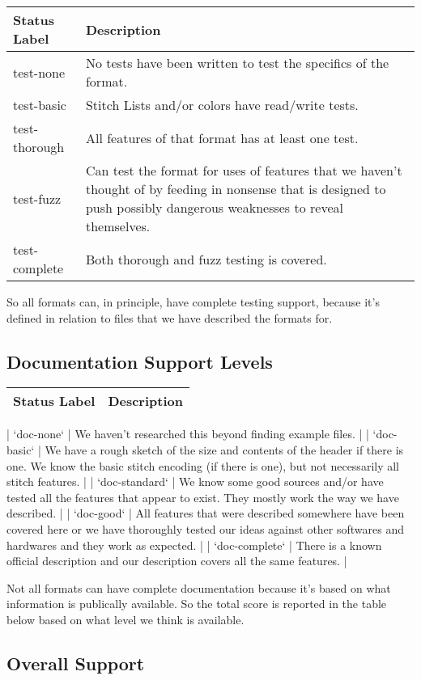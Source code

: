 \begin{longtable}{l p{8cm}}
Status Label & Description \\
\hline
test-none & No tests have been written to test the specifics of the format. \\
test-basic & Stitch Lists and/or colors have read/write tests. \\
test-thorough & All features of that format has at least one test. \\
test-fuzz & Can test the format for uses of features that we haven't thought of by feeding in nonsense that is designed to push possibly dangerous weaknesses to reveal themselves. \\
test-complete & Both thorough and fuzz testing is covered.
\end{longtable}

So all formats can, in principle, have complete testing support, because it's defined in relation to files that we have described the formats for.

\subsection{Documentation Support Levels}

\begin{longtable}{l p{8cm}}
Status Label & Description \\
\hline
\end{longtable}

| `doc-none` | We haven't researched this beyond finding example files. |
| `doc-basic` | We have a rough sketch of the size and contents of the header if there is one. We know the basic stitch encoding (if there is one), but not necessarily all stitch features. |
| `doc-standard` | We know some good sources and/or have tested all the features that appear to exist. They mostly work the way we have described. |
| `doc-good` | All features that were described somewhere have been covered here or we have thoroughly tested our ideas against other softwares and hardwares and they work as expected. |
| `doc-complete` | There is a known official description and our description covers all the same features. |

Not all formats can have complete documentation because it's based on what 
information is publically available. So the total score is reported in the table
below based on what level we think is available.

\subsection{Overall Support}

